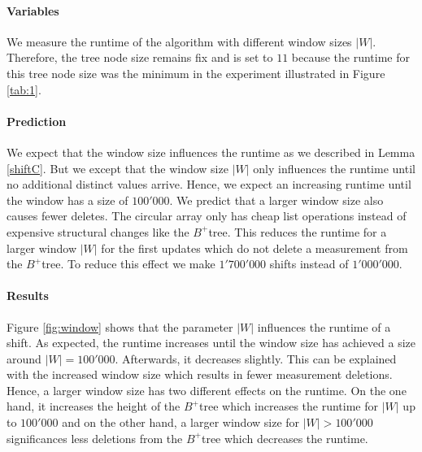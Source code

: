 \documentclass[abstracton,12pt,oneside]{scrreprt}
\begin{document}
\paragraph{Variables}
We measure the runtime of the algorithm with different window sizes $|W|$. Therefore, the tree node size remains fix and is set to $11$ because the runtime for this tree node size was the minimum in the experiment illustrated in Figure \ref{tab:1}.  

\paragraph{Prediction}
We expect that the window size influences the runtime as we described in Lemma \ref{shiftC}. But we except that the window size $|W|$ only influences the runtime until no additional distinct values arrive. Hence, we expect an increasing runtime until the window has a size of $100'000$. We predict that a larger window size also causes fewer deletes. The circular array only has cheap list operations instead of expensive structural changes like the $B^+$tree. This reduces the runtime for a larger window $|W|$ for the first updates which do not delete a measurement from the $B^+$tree. To reduce this effect we make $1'700'000$ shifts instead of $1'000'000$. 

\paragraph{Results}
Figure \ref{fig:window} shows that the parameter $|W|$ influences the runtime of a shift. As expected, the runtime increases until the window size has achieved a size around $|W| = 100'000$. Afterwards, it decreases slightly. This can be explained with the increased window size which results in fewer measurement deletions. Hence, a larger window size has two different effects on the runtime. On the one hand, it increases the height of the $B^+$tree which increases the runtime for $|W|$ up to $100'000$ and on the other hand, a larger window size for $|W|>100'000$ significances less deletions from the $B^+$tree which decreases the runtime.
\end{document}
